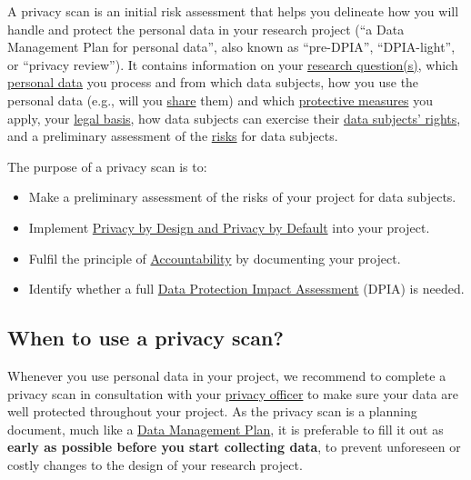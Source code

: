 \documentclass[
]{book}
\providecommand{\tightlist}{%
  \setlength{\itemsep}{0pt}\setlength{\parskip}{0pt}}
\begin{document}
A privacy scan is an initial risk assessment that helps you delineate how you
will handle and protect the personal data in your research project (``a Data
Management Plan for personal data'', also known as ``pre-DPIA'', ``DPIA-light'', or
``privacy review''). It contains information on your
\protect\hyperlink{purpose-limitation}{research question(s)}, which \protect\hyperlink{personal-data}{personal data}
you process and from which data subjects, how you use the personal data (e.g.,
will you \protect\hyperlink{data-sharing-collaboration}{share} them) and which
\protect\hyperlink{design-strategies}{protective measures} you apply, your \protect\hyperlink{legal-basis}{legal basis},
how data subjects can exercise their \protect\hyperlink{data-subject-rights}{data subjects' rights},
and a preliminary assessment of the \protect\hyperlink{risk-assessment}{risks} for data subjects.

The purpose of a privacy scan is to:

\begin{itemize}
\tightlist
\item
  Make a preliminary assessment of the risks of your project for data subjects.\\
\item
  Implement \protect\hyperlink{privacy-by-design}{Privacy by Design and Privacy by Default} into
  your project.
\item
  Fulfil the principle of \protect\hyperlink{accountability}{Accountability} by documenting your
  project.
\item
  Identify whether a full \protect\hyperlink{dpia}{Data Protection Impact Assessment} (DPIA) is needed.
\end{itemize}

\hypertarget{privacy-scan-when}{%
\subsection{When to use a privacy scan?}\label{privacy-scan-when}}

Whenever you use personal data in your project, we recommend to complete a
privacy scan in consultation with your \protect\hyperlink{support}{privacy officer}
to make sure your data are well protected throughout your project. As the
privacy scan is a planning document, much like a
\href{https://www.uu.nl/en/research/research-data-management/guides/data-management-planning}{Data Management Plan},
it is preferable to fill it out as \textbf{early as possible before you start
collecting data}, to prevent unforeseen or costly changes to the design of your
research project.
\end{document}
